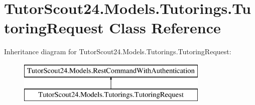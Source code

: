 \hypertarget{class_tutor_scout24_1_1_models_1_1_tutorings_1_1_tutoring_request}{}\section{Tutor\+Scout24.\+Models.\+Tutorings.\+Tutoring\+Request Class Reference}
\label{class_tutor_scout24_1_1_models_1_1_tutorings_1_1_tutoring_request}
Inheritance diagram for Tutor\+Scout24.\+Models.\+Tutorings.\+Tutoring\+Request\+:\begin{figure}[H]
\begin{center}
\leavevmode
\includegraphics[height=2.000000cm]{class_tutor_scout24_1_1_models_1_1_tutorings_1_1_tutoring_request}
\end{center}
\end{figure}
